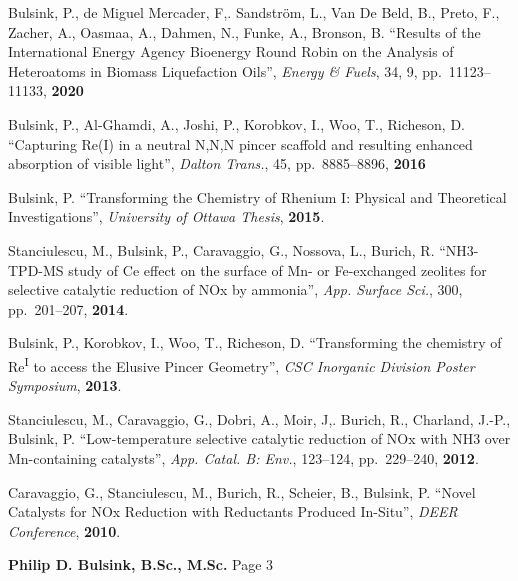 \documentclass[margin,line]{resumecls}
\begin{document}
\begin{resume}
    \vspace{0mm}
    Bulsink, P., de Miguel Mercader, F,. Sandström, L., Van De Beld, B., Preto, F., Zacher, A., Oasmaa, A., Dahmen, N., Funke, A., Bronson, B. ``Results of the International Energy Agency Bioenergy Round Robin on the Analysis of Heteroatoms in Biomass Liquefaction Oils'', \textit{Energy \& Fuels}, 34, 9, pp.\ 11123--11133, \textbf{2020}

    \vspace{0mm}
    Bulsink, P., Al-Ghamdi, A., Joshi, P., Korobkov, I., Woo, T., Richeson, D. ``Capturing Re(I) in a neutral N,N,N pincer scaffold and resulting enhanced absorption of visible light'', \textit{Dalton Trans.}, 45, pp.\ 8885--8896, \textbf{2016}

     \vspace{0mm}
    Bulsink, P. ``Transforming the Chemistry of Rhenium I: Physical and Theoretical Investigations'', \textit{University of Ottawa Thesis}, \textbf{2015}.

 	\vspace{0mm}
    Stanciulescu, M., Bulsink, P., Caravaggio, G., Nossova, L., Burich, R. ``NH3-TPD-MS study of Ce effect on the surface of Mn- or Fe-exchanged zeolites for selective catalytic reduction of NOx by ammonia'', \textit{App. Surface Sci.}, 300, pp.\ 201--207, \textbf{2014}.

	\vspace{0mm}
    Bulsink, P., Korobkov, I., Woo, T., Richeson, D. ``Transforming the chemistry of Re\textsuperscript{I} to access the Elusive Pincer Geometry'', \textit{CSC Inorganic Division Poster Symposium}, \textbf{2013}.

	\vspace{0mm}
    Stanciulescu, M., Caravaggio, G., Dobri, A., Moir, J,. Burich, R., Charland, J.-P., Bulsink, P. ``Low-temperature selective catalytic reduction of NOx with NH3 over Mn-containing catalysts'', \textit{App. Catal. B: Env.}, 123--124, pp.\ 229--240, \textbf{2012}.

	\vspace{0mm}
    Caravaggio, G., Stanciulescu, M., Burich, R., Scheier, B., Bulsink, P. ``Novel Catalysts for NOx Reduction with Reductants Produced In-Situ'', \textit{DEER Conference}, \textbf{2010}.
\vspace{1mm}

    \newpage
	\textbf{Philip D. Bulsink, B.Sc., M.Sc.} \hfill Page 3 \\
	\vspace{-4mm}

\end{resume}
\end{document}
